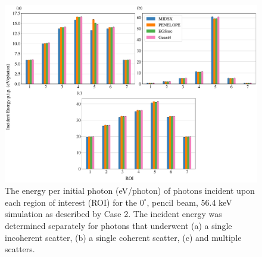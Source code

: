 \FloatBarrier



\begin{figure}[htpb]
    \centering
	\includegraphics[width=1.0\textwidth]{../figures/ROI_0_deg_pencil_paper_ready.pdf}
	\caption{The energy per initial photon (eV/photon) of photons incident upon each region of interest (ROI) for the $0^\circ$, pencil beam, 56.4 keV simulation as described by Case 2. The incident energy was determined separately for photons that underwent (a) a single incoherent scatter, (b) a single coherent scatter, (c) and multiple scatters.}
	\label{fig:ROIPGraph}
\end{figure}


